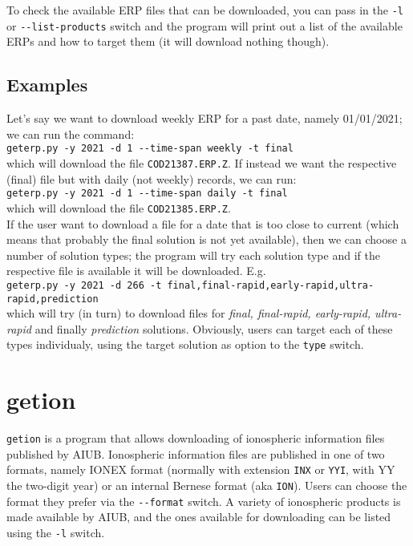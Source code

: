 To check the available ERP files that can be downloaded, you can pass in the \verb|-l| or 
\verb|--list-products| switch and the program will print out a list of the available 
ERPs and how to target them (it will download nothing though).

\subsection{Examples}
\label{ssec:programs-geterp}
Let's say we want to download weekly ERP for a past date, namely 01/01/2021; we 
can run the command:\\
\verb|geterp.py -y 2021 -d 1 --time-span weekly -t final|\\
which will download the file \verb|COD21387.ERP.Z|. If instead we want the respective 
(final) file but with daily (not weekly) records, we can run:\\
\verb|geterp.py -y 2021 -d 1 --time-span daily -t final|\\
which will download the file \verb|COD21385.ERP.Z|.
\\

If the user want to download a file for a date that is too close to current (which 
means that probably the final solution is not yet available), then we can choose a 
number of solution types; the program will try each solution type and if the respective 
file is available it will be downloaded. E.g.\\
\verb|geterp.py -y 2021 -d 266 -t final,final-rapid,early-rapid,ultra-rapid,prediction|\\
which will try (in turn) to download files for \emph{final, final-rapid, early-rapid, ultra-rapid}  
and finally \emph{prediction} solutions. Obviously, users can target each of these 
types individualy, using the target solution as option to the \verb|type| switch.

\section{getion}
\label{sec:programs-getion}
\verb|getion| is a program that allows downloading of ionospheric information 
files published by AIUB. Ionospheric information files are published in one of two 
formats, namely IONEX format (normally with extension \verb|INX| or 
\verb|YYI|, with YY the two-digit year) or an internal Bernese format (aka 
\verb|ION|). Users can choose the format they prefer via the \verb|--format| 
switch. A variety of ionospheric products is made available by AIUB, and the ones 
available for downloading can be listed using the \verb|-l| switch.

